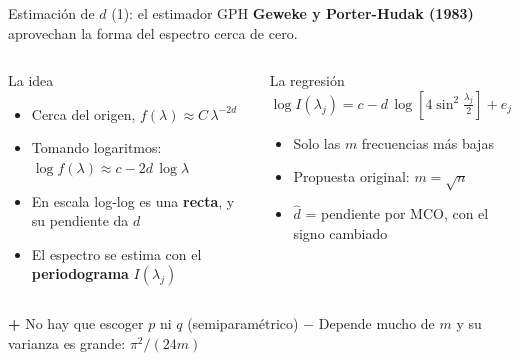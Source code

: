 \documentclass[aspectratio=169,11pt]{beamer}
\newcommand{\destacar}[1]{\textcolor{udeaverde}{\textbf{#1}}}
\begin{document}
\begin{frame}{Estimación de $d$ (1): el estimador GPH}
\textbf{Geweke y Porter-Hudak (1983)} aprovechan la forma del espectro cerca de cero.
\begin{columns}[T]
\begin{block}{La idea}
\begin{itemize}
\item Cerca del origen, $f(\lambda) \approx C\,\lambda^{-2d}$
\item Tomando logaritmos: $\log f(\lambda) \approx c - 2d\,\log\lambda$
\item En escala log-log es una \destacar{recta}, y su pendiente da $d$
\item El espectro se estima con el \destacar{periodograma} $I(\lambda_j)$
\end{itemize}
\end{block}
\begin{block}{La regresión}
\[
\log I(\lambda_j) = c - d\,\log\!\left[4\sin^2\!\tfrac{\lambda_j}{2}\right] + e_j
\]
\begin{itemize}
\item Solo las $m$ frecuencias más bajas
\item Propuesta original: $m = \sqrt{n}$
\item $\hat d$ = pendiente por MCO, con el signo cambiado
\end{itemize}
\end{block}
\end{columns}
\vspace{0.2cm}
\begin{columns}[T]
\textcolor{udeaverde}{\textbf{+}} No hay que escoger $p$ ni $q$ (semiparamétrico)
\textcolor{rojo}{\textbf{$-$}} Depende mucho de $m$ y su varianza es grande: $\pi^2/(24m)$
\end{columns}
\end{frame}
\end{document}

